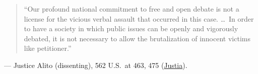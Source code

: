 \documentclass[12pt]{article}
\begin{document}
\begin{quote}
``Our profound national commitment to free and open debate is not a license for the vicious verbal assault that occurred in this case. \dots\ In order to have a society in which public issues can be openly and vigorously debated, it is not necessary to allow the brutalization of innocent victims like petitioner.''
\end{quote}
\noindent --- Justice Alito (dissenting), 562 U.S.\ at 463, 475 (\href{https://supreme.justia.com/cases/federal/us/562/443/}{Justia}).
\end{document}
